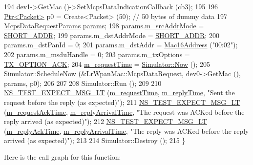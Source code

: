 \begin{DoxyCode}
194   dev1->GetMac ()->SetMcpsDataIndicationCallback (cb3);
195 
196   \hyperlink{classns3_1_1Ptr}{Ptr<Packet>} p0 = Create<Packet> (50);  \textcolor{comment}{// 50 bytes of dummy data}
197   \hyperlink{structns3_1_1McpsDataRequestParams}{McpsDataRequestParams} params;
198   params.\hyperlink{structns3_1_1McpsDataRequestParams_a31f4c281d07cf3b5992d45416bd71309}{m\_srcAddrMode} = \hyperlink{group__lr-wpan_gga9ea4702ab11d5329e1593afebce06bbba7bf58267dde39bdabfeeb5793450c5e3}{SHORT\_ADDR};
199   params.m\_dstAddrMode = \hyperlink{group__lr-wpan_gga9ea4702ab11d5329e1593afebce06bbba7bf58267dde39bdabfeeb5793450c5e3}{SHORT\_ADDR};
200   params.m\_dstPanId = 0;
201   params.m\_dstAddr = \hyperlink{classns3_1_1Mac16Address}{Mac16Address} (\textcolor{stringliteral}{"00:02"});
202   params.m\_msduHandle = 0;
203   params.m\_txOptions = \hyperlink{group__lr-wpan_gga74ea891230ebf45d80d69a67266930a4a270a37d12b62bb8b5e92d646456244cf}{TX\_OPTION\_ACK};
204   \hyperlink{classLrWpanAckTestCase_a18aeb3f02f751869c6a9f40f419da003}{m\_requestTime} = \hyperlink{group__simulator_gac3635e2e87f7ce316c89290ee1b01d0d}{Simulator::Now} ();
205   Simulator::ScheduleNow (&LrWpanMac::McpsDataRequest, dev0->GetMac (), params, p0);
206 
207 
208   Simulator::Run ();
209 
210   \hyperlink{group__testing_ga5e7f81b9d00df9c727e6281e1b1bbc55}{NS\_TEST\_EXPECT\_MSG\_LT} (\hyperlink{classLrWpanAckTestCase_a18aeb3f02f751869c6a9f40f419da003}{m\_requestTime}, 
      \hyperlink{classLrWpanAckTestCase_a1c185cc47cafba81b7f2b00ed2d22b5f}{m\_replyTime}, \textcolor{stringliteral}{"Sent the request before the reply (as expected)"});
211   \hyperlink{group__testing_ga5e7f81b9d00df9c727e6281e1b1bbc55}{NS\_TEST\_EXPECT\_MSG\_LT} (\hyperlink{classLrWpanAckTestCase_a3cae2bf67eb3227a831d7b3f64c38027}{m\_requestAckTime}, 
      \hyperlink{classLrWpanAckTestCase_af07e2f06722c98c42d0ffa89b2be052c}{m\_replyArrivalTime}, \textcolor{stringliteral}{"The request was ACKed before the reply arrived (as expected)"});
212   \hyperlink{group__testing_ga5e7f81b9d00df9c727e6281e1b1bbc55}{NS\_TEST\_EXPECT\_MSG\_LT} (\hyperlink{classLrWpanAckTestCase_ae34a3c8910c08e9442e258e35fd3930f}{m\_replyAckTime}, 
      \hyperlink{classLrWpanAckTestCase_af07e2f06722c98c42d0ffa89b2be052c}{m\_replyArrivalTime}, \textcolor{stringliteral}{"The reply was ACKed before the reply arrived (as expected)"});
213 
214   Simulator::Destroy ();
215 \}
\end{DoxyCode}


Here is the call graph for this function\+:




